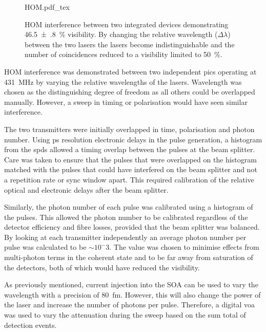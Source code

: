 \begin{figure}[tbp]
	\centering
	\def\svgwidth{0.8\textwidth} 
	{HOM.pdf_tex}
	\caption[Hong-Ou-Mandel interference between integrated devices]{\ac{HOM} interference between two integrated devices demonstrating \SI{46.5(8)}{\%} visibility. By changing the relative wavelength ($\Delta\lambda$) between the two lasers the lasers become indistinguishable and the number of coincidences reduced to a visibility limited to \SI{50}{\percent}.}
	\label{fig:HOM}
\end{figure}

\acl{HOM} interference was demonstrated between two independent \acp{pic} operating at \SI{431}{\MHz} by varying the relative wavelengths of the lasers. Wavelength was chosen as the distinguishing degree of freedom as all others could be overlapped manually. However, a sweep in timing or polarisation would have seen similar interference. 

The two transmitters were initially overlapped in time, polarisation and photon number. Using ps resolution electronic delays in the pulse generation, a histogram from the \acp{spd} allowed a timing overlap between the pulses at the beam splitter. Care was taken to ensure that the pulses that were overlapped on the histogram matched with the pulses that could have interfered on the beam splitter and not a repetition rate or sync window apart. This required calibration of the relative optical and electronic delays after the beam splitter. 

Similarly, the photon number of each pulse was calibrated using a histogram of the pulses. This allowed the photon number to be calibrated regardless of the detector efficiency and fibre losses, provided that the beam splitter was balanced. By looking at each transmitter independently an average photon number per pulse was calculated to be $\sim 10^-3$. The value was chosen to minimise effects from multi-photon terms in the coherent state and to be far away from saturation of the detectors, both of which would have reduced the visibility.

As previously mentioned, current injection into the \ac{SOA} can be used to vary the wavelength with a precision of \SI{80}{\femto\metre}. However, this will also change the power of the laser and increase the number of photons per pulse. Therefore, a digital \ac{voa} was used to vary the attenuation during the sweep based on the sum total of detection events. 

